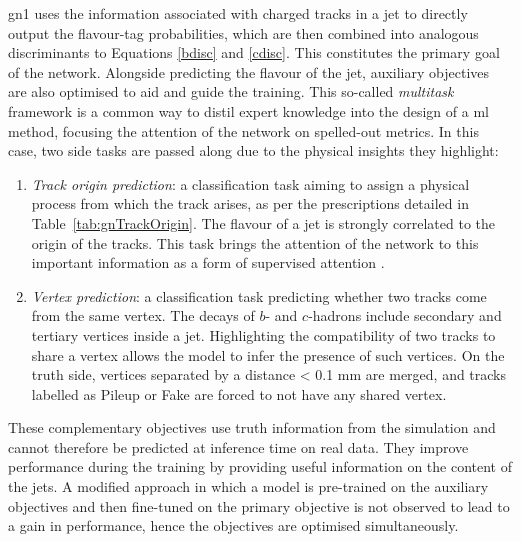 \gls{gn1} uses the information associated with charged tracks in a jet to directly output the flavour-tag probabilities, which are then combined into analogous discriminants to Equations \ref{bdisc} and \ref{cdisc}. This constitutes the primary goal of the network. Alongside predicting the flavour of the jet, auxiliary objectives are also optimised to aid and guide the training. This so-called \textit{multitask} framework is a common way to distil expert knowledge into the design of a \gls{ml} method, focusing the attention of the network on spelled-out metrics. In this case, two side tasks are passed along due to the physical insights they highlight:
\begin{enumerate}
\item \textit{Track origin prediction}: a classification task aiming to assign a physical process from which the track arises, as per the prescriptions detailed in Table~\ref{tab:gnTrackOrigin}. The flavour of a jet is strongly correlated to the origin of the tracks. This task brings the attention of the network to this important information as a form of supervised attention \cite{hwang2021selfsupervised}.
\item \textit{Vertex prediction}: a classification task predicting whether two tracks come from the same vertex. The decays of $b$- and $c$-hadrons include secondary and tertiary vertices inside a jet. Highlighting the compatibility of two tracks to share a vertex allows the model to infer the presence of such vertices. On the truth side, vertices separated by a distance < 0.1 mm are merged, and tracks labelled as Pileup or Fake are forced to not have any shared vertex.
\end{enumerate}
These complementary objectives use truth information from the simulation and cannot therefore be predicted at inference time on real data. They improve performance during the training by providing useful information on the content of the jets. A modified approach in which a model is pre-trained on the auxiliary objectives and then fine-tuned on the primary objective is not observed to lead to a gain in performance, hence the objectives are optimised simultaneously. \\

